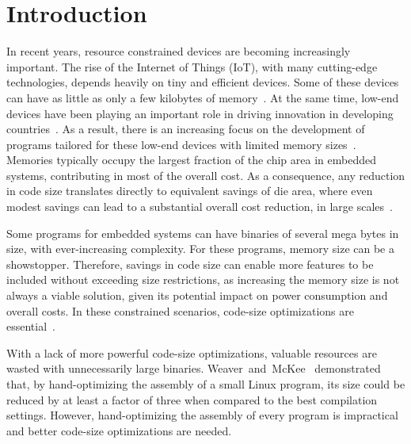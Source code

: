 \section{Introduction}
\label{sec:introduction}


In recent years, resource constrained devices are becoming increasingly important.
The rise of the Internet of Things (IoT), with many cutting-edge technologies,
depends heavily on tiny and efficient devices.
Some of these devices can have as little as only a few kilobytes of
memory~\cite{yelamarthi17,plaza18}.
At the same time, low-end devices have been playing an important role in driving
innovation in developing countries~\cite{hart02,etzo10}.
As a result, there is an increasing focus on the development of programs
tailored for these low-end devices with limited memory sizes~\cite{androidGo,hahm16}.
Memories typically occupy the largest fraction of the chip area in embedded
systems, contributing in most of the overall cost.
As a consequence, any reduction in code size translates directly to equivalent
savings of die area, where even modest savings can lead to a substantial overall
cost reduction, in large scales~\cite{edler10}.

Some programs for embedded systems can have binaries of several mega bytes in
size, with ever-increasing complexity.
For these programs, memory size can be a showstopper.
Therefore, savings in code size can enable more features to be included without
exceeding size restrictions, as increasing the memory size is not always a
viable solution, given its potential impact on power consumption and overall
costs.
In these constrained scenarios, code-size optimizations are essential~\cite{schultz03,varma04,sehgal12,kwan12,keoh14,auler17}.

With a lack of more powerful code-size optimizations, valuable resources are
wasted with unnecessarily large binaries.
Weaver~and~McKee~\cite{weaver09} demonstrated that, by hand-optimizing the
assembly of a small Linux program, its size could be reduced by at least a factor
of three when compared to the best compilation settings.
However, hand-optimizing the assembly of every program is impractical and better
code-size optimizations are needed.

